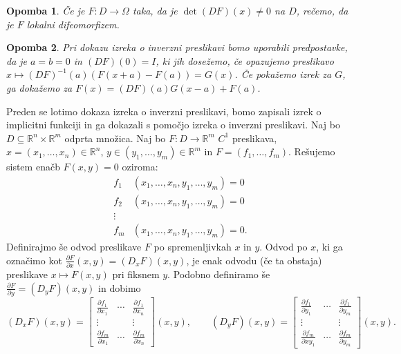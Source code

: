 \documentclass[10pt, a4paper]{article}
\newtheorem*{opomba}{Opomba}
\newcommand{\R}{\mathbb {R}}
\begin{document}
\begin{opomba}
    Če je $F: D \to \Omega$ taka, da je $\det (DF) (x) \neq 0$ na $D$, rečemo, da je $F$ lokalni difeomorfizem.
\end{opomba}

\begin{opomba}
    Pri dokazu izreka o inverzni preslikavi bomo uporabili predpostavke, da je $a = b = 0$ in $(DF) (0) = I$,
    ki jih dosežemo, če opazujemo preslikavo $x \mapsto (DF)^{-1} (a) (F(x + a) - F(a)) = G(x)$.
    Če pokažemo izrek za $G$, ga dokažemo za $F(x) = (DF) (a) G(x - a) + F(a)$.
\end{opomba}

Preden se lotimo dokaza izreka o inverzni preslikavi, bomo zapisali izrek o implicitni funkciji in ga dokazali 
s pomočjo izreka o inverzni preslikavi.
Naj bo $D \subseteq \R^n \times \R^m$ odprta množica. Naj bo $F: D \rightarrow \R^m$ $C^1$ preslikava,
$x = (x_1, \dots, x_n) \in \R^n$, $y \in (y_1, \dots, y_m) \in \R^m$ in $F = (f_1, \dots, f_m)$.
Rešujemo sistem enačb $F(x, y) = 0$ oziroma:
\begin{align*}
    f_1 &(x_1, \dots, x_n, y_1, \dots, y_m) = 0\\
    f_2 &(x_1, \dots, x_n, y_1, \dots, y_m) = 0\\
    \vdots & \\
    f_m & (x_1, \dots, x_n, y_1, \dots, y_m) = 0.
\end{align*}
Definirajmo še odvod preslikave $F$ po spremenljivkah $x$ in $y$.
Odvod po $x$, ki ga označimo kot $\frac{\partial F}{\partial x} (x, y) = (D_x F) (x, y)$,
je enak odvodu (če ta obstaja) preslikave $x \mapsto F(x, y)$ pri fiksnem $y$.
Podobno definiramo še $\frac{\partial F}{\partial y} = (D_y F) (x, y)$ in dobimo
\begin{equation*}
    (D_x F) (x, y) = \begin{bmatrix}
        \frac{\partial f_1}{\partial x_1} & \cdots & \frac{\partial f_1}{\partial x_n}\\
        \vdots & & \vdots\\
        \frac{\partial f_m}{\partial x_1} & \cdots & \frac{\partial f_m}{\partial x_n}
    \end{bmatrix} (x, y), \qquad 
    (D_y F) (x, y) = \begin{bmatrix}
        \frac{\partial f_1}{\partial y_1} & \cdots & \frac{\partial f_1}{\partial y_m}\\
        \vdots & & \vdots\\
        \frac{\partial f_m}{\partial xy_1} & \cdots & \frac{\partial f_m}{\partial y_m}
    \end{bmatrix} (x, y).
\end{equation*}
\end{document}
